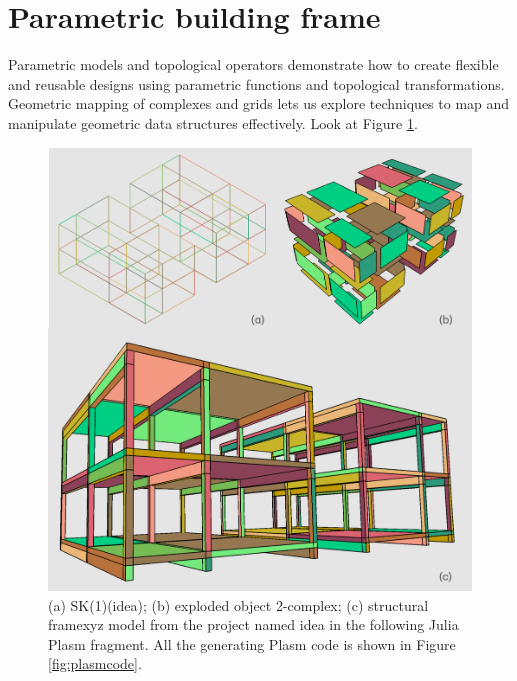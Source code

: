 \documentclass{juliacon}
\begin{document}



%


\appendix

\section{Parametric building frame}
\label{sec:additional_doc}

Parametric models and topological operators demonstrate how to create flexible and reusable designs using parametric functions and topological transformations.
Geometric mapping of complexes and grids lets us explore techniques to map and manipulate geometric data structures effectively. Look at Figure \ref{fig:cad25}.

\begin{figure}[htbp]
	\includegraphics[width=\linewidth]{figs/cad25-building}
	\caption{(a) {\sf SK(1)(idea)}; (b) exploded object 2-complex; (c) structural {\sf framexyz} model from the project named {\sf idea} in the following Julia {\sf Plasm} fragment. All the generating {\sf Plasm} code is shown in Figure \ref{fig:plasmcode}.}
	\label{fig:cad25}
\end{figure}
\end{document}
